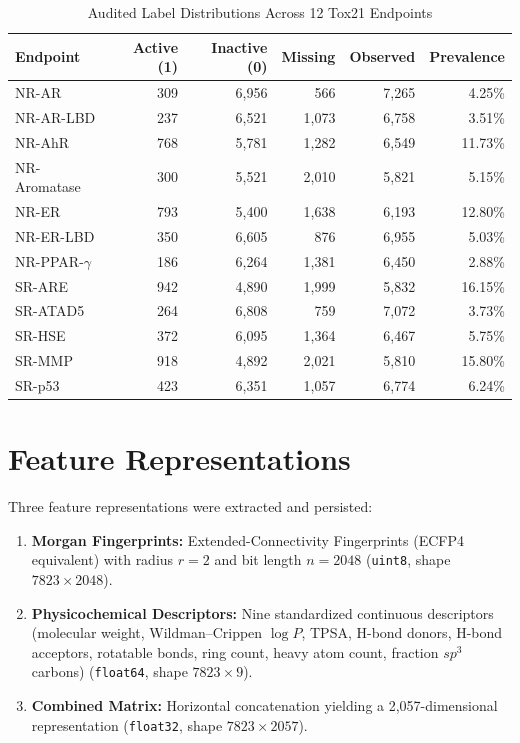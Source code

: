 \documentclass[conference]{IEEEtran}
\begin{document}
\begin{table}[htbp]
\caption{Audited Label Distributions Across 12 Tox21 Endpoints}
\begin{center}
\begin{tabular}{lrrrrr}
\toprule
\textbf{Endpoint} & \textbf{Active (1)} & \textbf{Inactive (0)} & \textbf{Missing} & \textbf{Observed} & \textbf{Prevalence} \\
\midrule
NR-AR & 309 & 6,956 & 566 & 7,265 & 4.25\% \\
NR-AR-LBD & 237 & 6,521 & 1,073 & 6,758 & 3.51\% \\
NR-AhR & 768 & 5,781 & 1,282 & 6,549 & 11.73\% \\
NR-Aromatase & 300 & 5,521 & 2,010 & 5,821 & 5.15\% \\
NR-ER & 793 & 5,400 & 1,638 & 6,193 & 12.80\% \\
NR-ER-LBD & 350 & 6,605 & 876 & 6,955 & 5.03\% \\
NR-PPAR-$\gamma$ & 186 & 6,264 & 1,381 & 6,450 & 2.88\% \\
SR-ARE & 942 & 4,890 & 1,999 & 5,832 & 16.15\% \\
SR-ATAD5 & 264 & 6,808 & 759 & 7,072 & 3.73\% \\
SR-HSE & 372 & 6,095 & 1,364 & 6,467 & 5.75\% \\
SR-MMP & 918 & 4,892 & 2,021 & 5,810 & 15.80\% \\
SR-p53 & 423 & 6,351 & 1,057 & 6,774 & 6.24\% \\
\bottomrule
\end{tabular}
\label{tab:endpoints}
\end{center}
\end{table}

\section{Feature Representations}
Three feature representations were extracted and persisted:
\begin{enumerate}
    \item \textbf{Morgan Fingerprints:} Extended-Connectivity Fingerprints (ECFP4 equivalent) with radius $r=2$ and bit length $n=2048$ (\texttt{uint8}, shape $7823 \times 2048$).
    \item \textbf{Physicochemical Descriptors:} Nine standardized continuous descriptors (molecular weight, Wildman--Crippen $\log P$, TPSA, H-bond donors, H-bond acceptors, rotatable bonds, ring count, heavy atom count, fraction $sp^3$ carbons) (\texttt{float64}, shape $7823 \times 9$).
    \item \textbf{Combined Matrix:} Horizontal concatenation yielding a 2,057-dimensional representation (\texttt{float32}, shape $7823 \times 2057$).
\end{enumerate}
\end{document}
